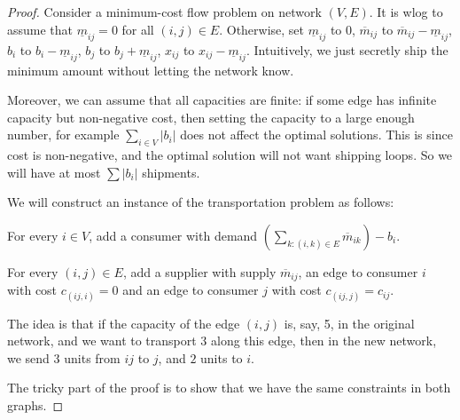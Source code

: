 \documentclass[a4paper]{article}
\begin{document}
\begin{proof}
  Consider a minimum-cost flow problem on network $(V, E)$. It is wlog to assume that $\underline{m}_{ij} = 0$ for all $(i, j) \in E$. Otherwise, set $\underline{m}_{ij}$ to $0$, $\overline{m}_{ij}$ to $\overline{m}_{ij} - \underline{m}_{ij}$, $b_i$ to $b_i - \underline{m}_{ij}$, $b_j$ to $b_j + \underline{m}_{ij}$, $x_{ij}$ to $x_{ij} - \underline{m}_{ij}$. Intuitively, we just secretly ship the minimum amount without letting the network know.

  Moreover, we can assume that all capacities are finite: if some edge has infinite capacity but non-negative cost, then setting the capacity to a large enough number, for example $\sum_{i \in V}|b_i|$ does not affect the optimal solutions. This is since cost is non-negative, and the optimal solution will not want shipping loops. So we will have at most $\sum |b_i|$ shipments.

  We will construct an instance of the transportation problem as follows:

  For every $i\in V$, add a consumer with demand $\left(\sum_{k: (i, k)\in E}\overline{m}_{ik}\right) - b_i$.

  For every $(i, j)\in E$, add a supplier with supply $\overline{m}_{ij}$, an edge to consumer $i$ with cost $c_{(ij, i)} = 0$ and an edge to consumer $j$ with cost $c_{(ij, j)} = c_{ij}$.
  \begin{center}
  \end{center}
  The idea is that if the capacity of the edge $(i, j)$ is, say, 5, in the original network, and we want to transport $3$ along this edge, then in the new network, we send $3$ units from $ij$ to $j$, and $2$ units to $i$.

  The tricky part of the proof is to show that we have the same constraints in both graphs.


\end{proof}
\end{document}
